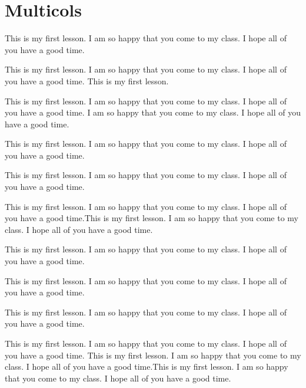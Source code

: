 \documentclass[12pt]{article}
\begin{document}
\section{Multicols}
This is my first lesson. I am so happy that you come to my class. I hope all of you have a good time.

\begin{multicols}{3}
This is my first lesson. I am so happy that you come to my class. I hope all of you have a good time. This is my first lesson.
\columnbreak

This is my first lesson. I am so happy that you come to my class. I hope all of you have a good time.
 I am so happy that you come to my class. I hope all of you have a good time.
\end{multicols}

This is my first lesson. I am so happy that you come to my class. I hope all of you have a good time.

\begin{multicols}{3}
\setlength{\columnseprule}{2pt}
\def\columnseprulecolor{\color{red}}

This is my first lesson. I am so happy that you come to my class. I hope all of you have a good time.

This is my first lesson. I am so happy that you come to my class. I hope all of you have a good time.This is my first lesson. I am so happy that you come to my class. I hope all of you have a good time.

This is my first lesson. I am so happy that you come to my class. I hope all of you have a good time.

This is my first lesson. I am so happy that you come to my class. I hope all of you have a good time.
\end{multicols}

This is my first lesson. I am so happy that you come to my class. I hope all of you have a good time.
\begin{center}
\begin{minipage}{0.8\textwidth}
This is my first lesson. I am so happy that you come to my class. I hope all of you have a good time.
This is my first lesson. I am so happy that you come to my class. I hope all of you have a good time.This is my first lesson. I am so happy that you come to my class. I hope all of you have a good time.

\end{minipage}
\end{center}
\end{document}
